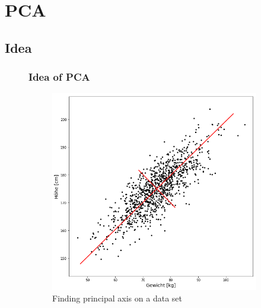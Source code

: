 \documentclass{beamer}
\theoremstyle{plain}
\theoremstyle{definition}
\begin{document}

\section{PCA} 
\subsection{Idea}
\begin{frame}
\begin{figure}
\frametitle{Idea of PCA}
\centering
	\begin{subfigure}{0.45\textwidth}
	\centering
	\captionsetup{justification=centering}
	\includegraphics[width = \textwidth]{figures/pca_example.png}
	\caption{Finding principal axis on a data set}
	\end{subfigure}
	\begin{subfigure}{0.45\textwidth}
	\centering
	\captionsetup{justification=centering}

\end{subfigure}
\end{figure}
\end{frame}
\end{document}
